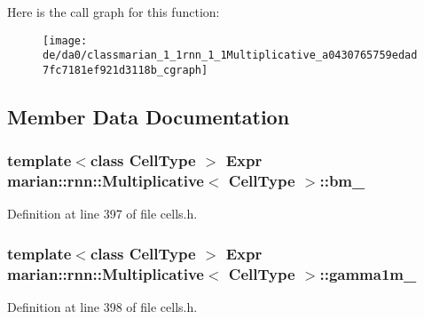 Here is the call graph for this function\+:
\nopagebreak
\begin{figure}[H]
\begin{center}
\leavevmode
\texttt{[image: de/da0/classmarian\_1\_1rnn\_1\_1Multiplicative\_a0430765759edad7fc7181ef921d3118b\_cgraph]}
\end{center}
\end{figure}




\subsection{Member Data Documentation}
\subsubsection[{\texorpdfstring{bm\+\_\+}{bm_}}]{\setlength{\rightskip}{0pt plus 5cm}template$<$class Cell\+Type $>$ {\bf Expr} {\bf marian\+::rnn\+::\+Multiplicative}$<$ Cell\+Type $>$\+::bm\+\_\+\hspace{0.3cm}{\ttfamily [protected]}}\hypertarget{classmarian_1_1rnn_1_1Multiplicative_a26cdb5d0561b1958105dbdb56c4ee13f}{}\label{classmarian_1_1rnn_1_1Multiplicative_a26cdb5d0561b1958105dbdb56c4ee13f}


Definition at line 397 of file cells.\+h.

\subsubsection[{\texorpdfstring{gamma1m\+\_\+}{gamma1m_}}]{\setlength{\rightskip}{0pt plus 5cm}template$<$class Cell\+Type $>$ {\bf Expr} {\bf marian\+::rnn\+::\+Multiplicative}$<$ Cell\+Type $>$\+::gamma1m\+\_\+\hspace{0.3cm}{\ttfamily [protected]}}\hypertarget{classmarian_1_1rnn_1_1Multiplicative_a3708c56833f8a2c5a2a44fea9571ffd7}{}\label{classmarian_1_1rnn_1_1Multiplicative_a3708c56833f8a2c5a2a44fea9571ffd7}


Definition at line 398 of file cells.\+h.

